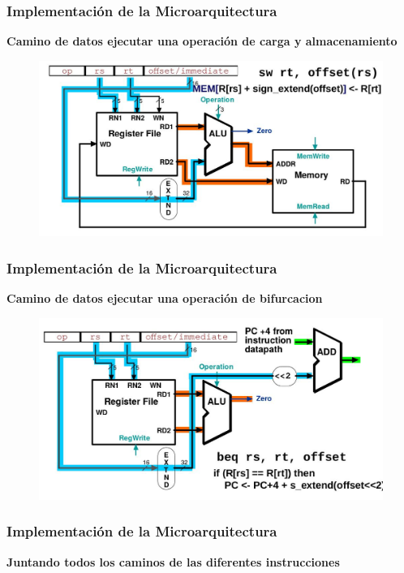 \documentclass[aspectratio=169,compress]{beamer}
\begin{document}
\begin{footnotesize}
\begin{frame}
\frametitle{Implementación de la Microarquitectura}
\begin{center}\textbf{Camino de datos ejecutar una operación de carga y almacenamiento}\end{center}
\begin{figure}
\includegraphics[scale=0.3]{images/tipo-i-sw.jpg} 
\end{figure}

\end{frame}



\begin{frame}
\frametitle{Implementación de la Microarquitectura}
\begin{center}\textbf{Camino de datos ejecutar una operación de bifurcacion}\end{center}
\begin{figure}
\includegraphics[scale=0.3]{images/tipo-i-beq.jpg} 
\end{figure}

\end{frame}


\begin{frame}
\frametitle{Implementación de la Microarquitectura}
\begin{center}\textbf{Juntando todos los caminos de las diferentes instrucciones}\end{center}


\end{frame}
\end{footnotesize}
\end{document}
